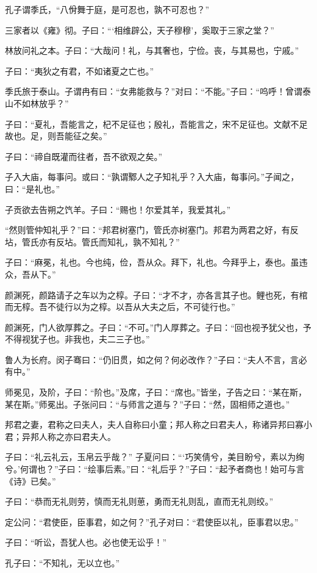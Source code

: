 \documentclass[a5paper]{ctexbook}
\begin{document}
    孔子谓季氏，“八佾舞于庭，是可忍也，孰不可忍也？”

    三家者以《雍》彻。子曰：“‘相维辟公，天子穆穆’，奚取于三家之堂？”

    林放问礼之本。子曰：“大哉问！礼，与其奢也，宁俭。丧，与其易也，宁戚。”

    子曰：“夷狄之有君，不如诸夏之亡也。”

    季氏旅于泰山。子谓冉有曰：“女弗能救与？”对曰：“不能。”子曰：“呜呼！曾谓泰山不如林放乎？”

    子曰：“夏礼，吾能言之，杞不足征也；殷礼，吾能言之，宋不足征也。文献不足故也。足，则吾能征之矣。”

    子曰：“禘自既灌而往者，吾不欲观之矣。”

    子入大庙，每事问。或曰：“孰谓鄹人之子知礼乎？入大庙，每事问。”子闻之，曰：“是礼也。”

    子贡欲去告朔之饩羊。子曰：“赐也！尔爱其羊，我爱其礼。”

    “然则管仲知礼乎？”曰：“邦君树塞门，管氏亦树塞门。邦君为两君之好，有反坫，管氏亦有反坫。管氏而知礼，孰不知礼？”

    子曰：“麻冕，礼也。今也纯，俭，吾从众。拜下，礼也。今拜乎上，泰也。虽违众，吾从下。”

    颜渊死，颜路请子之车以为之椁。子曰：“才不才，亦各言其子也。鲤也死，有棺而无椁。吾不徒行以为之椁。以吾从大夫之后，不可徒行也。”

    颜渊死，门人欲厚葬之。子曰：“不可。”门人厚葬之。子曰：“回也视予犹父也，予不得视犹子也。非我也，夫二三子也。”

    鲁人为长府。闵子骞曰：“仍旧贯，如之何？何必改作？”子曰：“夫人不言，言必有中。”

    师冕见，及阶，子曰：“阶也。”及席，子曰：“席也。”皆坐，子告之曰：“某在斯，某在斯。”师冕出。子张问曰：“与师言之道与？”子曰：“然，固相师之道也。”

    邦君之妻，君称之曰夫人，夫人自称曰小童；邦人称之曰君夫人，称诸异邦曰寡小君；异邦人称之亦曰君夫人。

    子曰：“礼云礼云，玉帛云乎哉？”    子夏问曰：“‘巧笑倩兮，美目盼兮，素以为绚兮。’何谓也？”子曰：“绘事后素。”曰：“礼后乎？”子曰：“起予者商也！始可与言《诗》已矣。”

    子曰：“恭而无礼则劳，慎而无礼则葸，勇而无礼则乱，直而无礼则绞。”

    定公问：“君使臣，臣事君，如之何？”孔子对曰：“君使臣以礼，臣事君以忠。”

    子曰：“听讼，吾犹人也。必也使无讼乎！”

    孔子曰：“不知礼，无以立也。”
\end{document}
